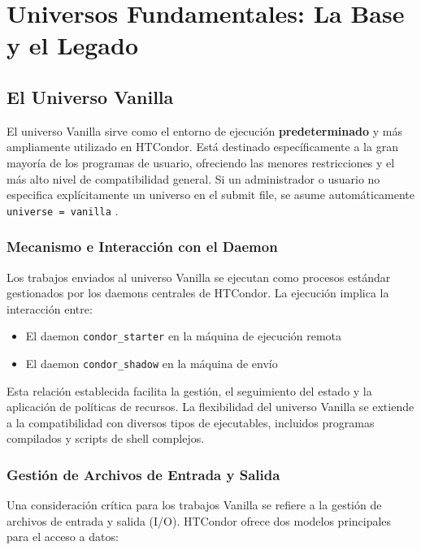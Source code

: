 \section{Universos Fundamentales: La Base y el Legado}

\subsection{El Universo Vanilla}

El universo Vanilla sirve como el entorno de ejecución \textbf{predeterminado} y más ampliamente utilizado en HTCondor. Está destinado específicamente a la gran mayoría de los programas de usuario, ofreciendo las menores restricciones y el más alto nivel de compatibilidad general. Si un administrador o usuario no especifica explícitamente un universo en el submit file, se asume automáticamente \texttt{universe = vanilla} \citep{CERNBatchDocs}.

\subsubsection{Mecanismo e Interacción con el Daemon}

Los trabajos enviados al universo Vanilla se ejecutan como procesos estándar gestionados por los daemons centrales de HTCondor. La ejecución implica la interacción entre:

\begin{itemize}
	\item El daemon \texttt{condor\_starter} en la máquina de ejecución remota
	\item El daemon \texttt{condor\_shadow} en la máquina de envío
\end{itemize}

Esta relación establecida facilita la gestión, el seguimiento del estado y la aplicación de políticas de recursos. La flexibilidad del universo Vanilla se extiende a la compatibilidad con diversos tipos de ejecutables, incluidos programas compilados y scripts de shell complejos.

\subsubsection{Gestión de Archivos de Entrada y Salida}

Una consideración crítica para los trabajos Vanilla se refiere a la gestión de archivos de entrada y salida (I/O). HTCondor ofrece dos modelos principales para el acceso a datos:

